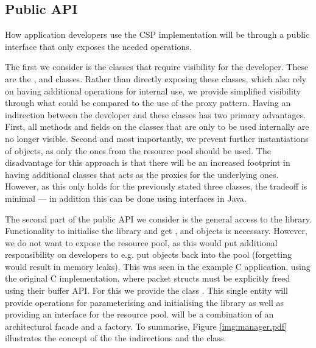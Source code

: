 \subsection{Public API}
How application developers use the CSP implementation will be through a public interface that only exposes the needed operations. 

The first we consider is the classes that require visibility for the developer. These are the ,  and  classes. Rather than directly exposing these classes, which also rely on having additional operations for internal use, we provide simplified visibility through what could be compared to the use of the proxy pattern\cite{Gamma:1995:DPE:186897}. Having an indirection between the developer and these classes has two primary advantages. First, all methods and fields on the classes that are only to be used internally are no longer visible. Second and most importantly, we prevent further instantiations of objects, as only the ones from the resource pool should be used. The disadvantage for this approach is that there will be an increased footprint in having additional classes that acts as the proxies for the underlying ones. However, as this only holds for the previously stated three classes, the tradeoff is minimal --- in addition this can be done using interfaces in Java.

The second part of the public API we consider is the general access to the library. Functionality to initialise the library and get ,  and  objects is necessary. However, we do not want to expose the resource pool, as this would put additional responsibility on developers to e.g. put objects back into the pool (forgetting would result in memory leaks). This was seen in the example C application, using the original C implementation, where packet structs must be explicitly freed using their buffer API. For this we provide the class . This single entity will provide operations for parameterising and initialising the library as well as providing an interface for the resource pool.  will be a combination of an architectural facade and a factory\cite{Gamma:1995:DPE:186897}. To summarise, Figure \ref{img:manager.pdf} illustrates the concept of the the indirections and the  class.
